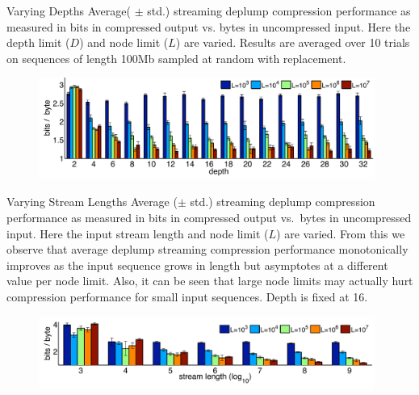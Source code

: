 \documentclass{beamer}
\begin{document}
\begin{frame}[t]{Varying Depths}
 Average( $\pm$ std.) streaming deplump compression performance as measured in bits in compressed output vs. bytes in uncompressed input. Here the depth limit ($D$) and node limit ($L$) are varied. Results are averaged over 10 trials on sequences of length 100Mb sampled at random with replacement.
   	\begin{figure}[t]
		\begin{center}
			\includegraphics[width = 11cm]{../figs/varying_depths.pdf}
		\end{center}
	\end{figure}
\end{frame}

\begin{frame}[t]{Varying Stream Lengths}
	Average ($\pm$ std.) streaming deplump compression performance as measured in bits in compressed output vs.~bytes in uncompressed input.  Here the input stream length and node limit ($L$) are varied.  From this we observe that average deplump streaming compression performance monotonically improves as the input sequence grows in length but asymptotes at a different value per node limit. Also, it can be seen that large node limits may actually hurt compression performance for small input sequences.  Depth is fixed at 16.
	   	\begin{figure}[t]
		\begin{center}
			\includegraphics[width = 11cm]{../figs/varying_stream_length.pdf}
		\end{center}
	\end{figure}
\end{frame}
\end{document}
